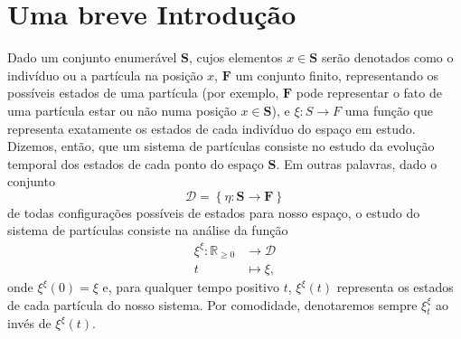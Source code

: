 \documentclass[twoside,openright,titlepage,numbers=noenddot,headinclude,  lineheaders footinclude=true,cleardoublepage=empty,
                                BCOR=5mm,paper=a4,fontsize=12pt ]{scrbook}
\theoremstyle{definition}
\begin{document}
\section{Uma breve Introdu\c{c}\~ao}
Dado um conjunto enumerável $\mathbf{S}$, cujos elementos
$x \in \mathbf{S}$ serão denotados como o indivíduo ou a
partícula na posição $x$, 
$\mathbf{F}$ um conjunto finito, representando os
possíveis estados de uma partícula (por exemplo,
$\mathbf{F}$ pode representar o fato de uma partícula
estar ou não numa posição $x \in \mathbf{S}$),
 e $\xi: S \rightarrow F$
uma função que representa exatamente os estados de cada indivíduo
do espaço em estudo. Dizemos, então, que um sistema de partículas
consiste no estudo da evolução temporal dos estados de cada
ponto do espaço $\mathbf{S}$. Em outras palavras, dado
o conjunto
\[
\mathscr{D} = \left\{ \eta: \mathbf{S} \rightarrow \mathbf{F}
\right\}
\]
de todas 
configurações possíveis
de estados para nosso espaço, o estudo do sistema de partículas
consiste na análise da função
\begin{align*}
\xi^{\xi}:  \mathbb{R}_{\geq 0} & \rightarrow  \mathscr{D}\\
     t & \mapsto  \xi,
\end{align*}
onde $\xi^{\xi}(0) = \xi$ e, para qualquer tempo positivo $t$,
$\xi^{\xi}(t)$ representa os estados de cada partícula do nosso
sistema. Por comodidade, denotaremos sempre
$\xi^{\xi}_t$ ao invés de $\xi^{\xi}(t)$.
\end{document}
